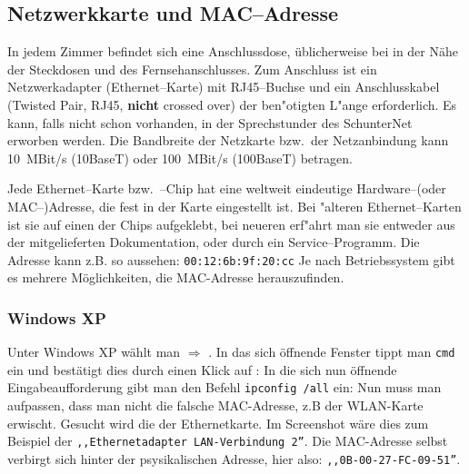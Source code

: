 
\subsection{Netzwerkkarte und MAC--Adresse}
\label{sec:netzw-und-mac}
In jedem Zimmer befindet sich eine Anschlussdose, üblicherweise bei
in der Nähe der Steckdosen und des Fernsehanschlusses.
\rm Zum Anschluss ist ein Netzwerkadapter (Ethernet--Karte) mit RJ45--Buch\-se und
ein Anschlusskabel (Twisted Pair, RJ45, \textbf{nicht} crossed over) der
ben"otigten L"ange erforderlich. Es  kann, falls nicht schon
vorhanden, in der \glossar Sprechstunder des SchunterNet erworben werden.
Die Bandbreite der Netzkarte bzw.\  der Netzanbindung kann 10~MBit/s
(10BaseT) oder 100~MBit/s (100BaseT) betragen. 

Jede Ethernet--Karte bzw.\ --Chip hat eine weltweit eindeutige Hardware--(oder
\glossar MAC--)Adresse, die fest in der Karte eingestellt ist. Bei "alteren
Ethernet--Karten ist sie auf einen der Chips aufgeklebt, bei neueren
erf"ahrt man sie entweder aus der mitgelieferten Dokumentation, oder
durch ein Service--Programm.%
Die Adresse kann z.B. so aussehen: \texttt{00:12:6b:9f:20:cc}
Je nach Betriebssystem gibt es mehrere Möglichkeiten, die MAC-Adresse
herauszufinden.
\newpage
\subsubsection*{Windows XP}
Unter Windows XP wählt man  $\Rightarrow$
.  In das sich öffnende Fenster tippt man  \texttt{cmd}
ein und bestätigt dies durch einen Klick auf :
 In die sich
nun öffnende Eingabeaufforderung gibt man den Befehl \texttt{ipconfig /all}
ein: %
Nun muss man aufpassen, dass man nicht die falsche MAC-Adresse, z.B
der WLAN-Karte erwischt. Gesucht wird die der Ethernetkarte. Im
Screenshot wäre dies zum Beispiel der \texttt{,,Ethernetadapter LAN-Verbindung
2''}. Die MAC-Adresse selbst verbirgt sich hinter der psysikalischen
Adresse, hier also: \texttt{,,0B-00-27-FC-09-51''}.%
%
